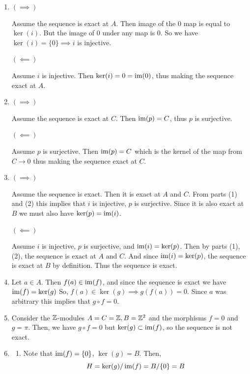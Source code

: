 \documentclass[Notebook.tex]{subfiles}
\begin{document}
\begin{solution}
    \bbni
    
    \begin{enumerate}
        \item $(\implies)$ 
        
        Assume the sequence is exact at $A$. 
        Then image of the $0$ map is equal to $\ker(i)$. But the image of $0$ under any map is $0$. So we have $\ker(i) = \{0\} \implies i$ is injective.

        $(\impliedby)$ 

        Assume $i$ is injective. Then $\ker(i) = 0 = \operatorname{im}(0)$, thus making the sequence exact at $A$. 

        \item $(\implies)$ 
        
        Assume the sequence is exact at $C$. 
        Then $\operatorname{im}(p) = C$, thus $p$ is surjective. 

        $(\impliedby)$ 

        Assume $p$ is surjective. Then $\operatorname{im}(p) = C$ which is the kernel of the map from $C \to 0$ thus making the sequence exact at $C$. 

        \item $(\implies)$ 
        
        Assume the sequence is exact. Then it is exact at $A$ and $C$. From parts (1) and (2) this implies that $i$ is injective, $p$ is surjective. Since it is also exact at $B$ we must also have $\ker(p) = \operatorname{im}(i)$. 

        $(\impliedby)$ 

        Assume $i$ is injective, $p$ is surjective, and $\operatorname{im}(i) = \ker(p)$. Then by parts (1), (2), the sequence is exact at $A$ and $C$. And since $\operatorname{im}(i) = \ker(p)$, the sequence is exact at $B$ by definition. Thus the sequence is exact. 
        
        \item Let $a \in A$. Then $f(a) \in \operatorname{im}(f)$, and since the sequence is exact we have $\operatorname{im}(f) = \ker(g)$ So, $f(a) \in \ker(g) \implies g(f(a)) = 0$. Since $a$ was arbitrary this implies that $g \circ f = 0$. 
        
        \item Consider the $\mathbb Z$-modules $A = C = \mathbb Z, B =\mathbb Z^2$ and the morphisms $f = 0$ and $g = \pi$. Then, we have $g \circ f = 0$ but $\ker(g) \subset \operatorname{im}(f)$, so the sequence is not exact. 
        
        \item \begin{enumerate}
            \item Note that $\operatorname{im}(f) = \{0\}$, $\ker(g) = B$. Then, 
            \[H = \ker(g)/\operatorname{im}(f) = B/\{0\} = B\]


\end{enumerate}
\end{enumerate}
\end{solution}
\end{document}
